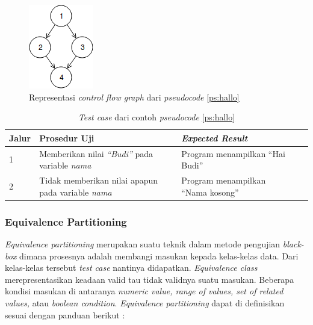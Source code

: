 \begin{figure}[H]
  \centering
  \includegraphics[width=.14\linewidth]{img/test-case/4node} %
  \caption{Representasi \emph{control flow graph} dari \emph{pseudocode} \ref{ps:hallo}}
  \label{cfg:hallo}
\end{figure}

\begin{longtable}{|P{.06\textwidth}|P{.30\textwidth}|P{.30\textwidth}|P{.10\textwidth}|P{.08\textwidth}|}
  \caption{\emph{Test case} dari contoh \emph{pseudocode} \ref{ps:hallo}} \label{tc:hallo}\\
  \hline
  \textbf{Jalur} & \textbf{Prosedur Uji} & \textbf{\emph{Expected Result}} \\\hline
  1 & Memberikan nilai \emph{``Budi''} pada variable \emph{nama} &
                                                                   Program menampilkan ``Hai Budi'' \\\hline
  2 & Tidak memberikan nilai apapun pada variable \emph{nama} &
                                                                   Program menampilkan ``Nama kosong'' \\\hline

\end{longtable}


\subsubsection{Equivalence Partitioning}

\emph{Equivalence partitioning} merupakan suatu teknik dalam metode
pengujian \emph{black-box} dimana prosesnya adalah membangi masukan
kepada kelas-kelas data. Dari kelas-kelas tersebut \emph{test case}
nantinya didapatkan. \emph{Equivalence class} merepresentasikan
keadaan valid tau tidak validnya suatu masukan. Beberapa kondisi
masukan di antaranya \emph{numeric value, range of values, set of
related values,} atau \emph{boolean condition}. \emph{Equivalence
partitioning} dapat di definisikan sesuai dengan panduan berikut
\parencite{presman2010software}:

